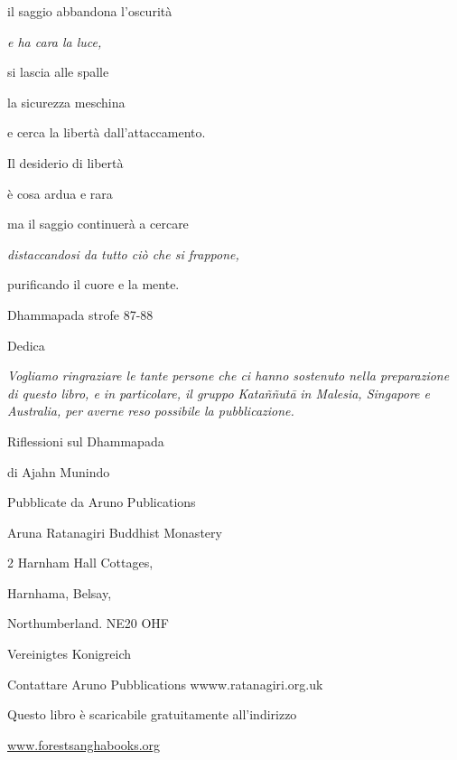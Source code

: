 \documentclass[a4paper,portrait,12pt]{article}
\begin{document}
il saggio abbandona l'oscurit\`{a}


\emph{e ha cara la luce,}


si lascia alle spalle 


la sicurezza meschina


e cerca la libert\`{a} dall'attaccamento.


Il desiderio di libert\`{a} 


\`{e} cosa ardua e rara 


ma il saggio continuer\`{a} a cercare


\emph{distaccandosi da tutto ci\`{o} che si frappone,}


purificando il cuore e la mente.





Dhammapada strofe 87-88


\newpage



Dedica





\emph{Vogliamo ringraziare le tante persone che ci hanno sostenuto nella preparazione di questo libro, e in particolare, il gruppo Kata}\emph{\~{n}\~{n}}\emph{ut}\emph{\=a}\emph{ in Malesia, Singapore e Australia, per averne reso possibile la pubblicazione.}


\newpage



Riflessioni sul Dhammapada


di Ajahn Munindo





Pubblicate da Aruno Publications


Aruna Ratanagiri Buddhist Monastery


2 Harnham Hall Cottages,


Harnhama, Belsay,


Northumberland. NE20 OHF


Vereinigtes Konigreich





Contattare Aruno Pubblications wwww.ratanagiri.org.uk


Questo libro \`{e} scaricabile gratuitamente all'indirizzo


\href{http://www.forestsanghabooks.org/}{www.forestsanghabooks.org}
\end{document}
